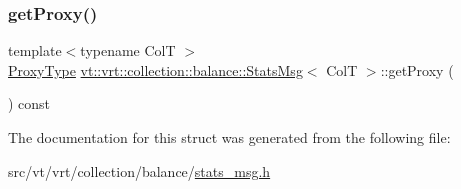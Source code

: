 \mbox{\label{structvt_1_1vrt_1_1collection_1_1balance_1_1_stats_msg_ad6c41dfbee2143acc207716115023933}} 
\subsubsection{\texorpdfstring{get\+Proxy()}{getProxy()}}
{\footnotesize\ttfamily template$<$typename ColT $>$ \\
\hyperlink{structvt_1_1vrt_1_1collection_1_1balance_1_1_stats_msg_a6f88a58947e0a02b3f7dcfec8b91b5fd}{Proxy\+Type} \hyperlink{structvt_1_1vrt_1_1collection_1_1balance_1_1_stats_msg}{vt\+::vrt\+::collection\+::balance\+::\+Stats\+Msg}$<$ ColT $>$\+::get\+Proxy (\begin{DoxyParamCaption}{ }\end{DoxyParamCaption}) const\hspace{0.3cm}{\ttfamily [inline]}}



The documentation for this struct was generated from the following file\+:\begin{DoxyCompactItemize}
\item 
src/vt/vrt/collection/balance/\hyperlink{stats__msg_8h}{stats\+\_\+msg.\+h}\end{DoxyCompactItemize}
